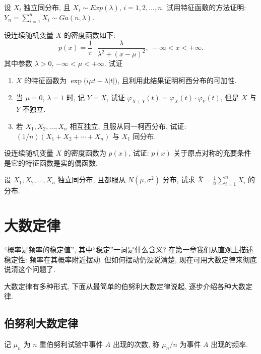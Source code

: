 \begin{xiti}
    \item 设 $ X_i $ 独立同分布, 且 $ X_i \sim Exp ( \lambda ) $, $ i = 1,2,\dotsc,n $. 试用特征函敷的方法证明: $ Y_n = \sum_{i=1}^n X_i \sim Ga ( n, \lambda ) $.
    \item 设连续随机变量 $ X $ 的密度函数如下:
    \begin{equation*}
        p (x) = \frac{1}{\pi} \cdot \frac{\lambda}{\lambda^2 + ( x - \mu )^2}, \ -\infty < x < +\infty.
    \end{equation*}
    其中参数 $ \lambda > 0 $, $ -\infty < \mu < +\infty $. 试证
    \begin{enumerate}
        \item $ X $ 的特征函数为 $ \exp \bigl( i\mu t - \lambda \lvert t \rvert \bigr) $, 且利用此结果证明柯西分布的可加性.
        \item 当 $ \mu = 0 $, $ \lambda = 1 $ 时, 记 $ Y = X $, 试证 $ \varphi_{X + Y} (t) = \varphi_X (t) \cdot \varphi_Y (t) $, 但是 $ X $ 与 $ Y $ 不独立.
        \item 若 $ X_1, X_2, \dotsc, X_n $ 相互独立, 且服从同一柯西分布, 试证: $ (1/n) ( X_1 + X_2 + \dotsb + X_n ) $ 与 $ X_1 $ 同分布.
    \end{enumerate}
    \item 设连续随机变量 $ X $ 的密度函数为 $ p (x) $, 试证: $ p (x) $ 关于原点对称的充要条件是它的特征函数是实的偶函数.
    \item 设 $ X_1, X_2, \dotsc, X_n $ 独立同分布, 且都服从 $ N (\mu, \sigma^2) $ 分布, 试求 $ \bar{X} = \frac{1}{n} \sum_{i=1}^n X_i $ 的分布.
\end{xiti}

\section{大数定律}\label{sec:4.2}

``概率是频率的稳定值'', 其中``稳定''一词是什么含义?
在第一章我们从直观上描述稳定性: 频率在其概率附近摆动.
但如何摆动仍没说清楚, 现在可用大数定律来彻底说清这个问题了.

大数定律有多种形式, 下面从最简单的伯努利大数定律说起, 逐步介绍各种大数定律.

\subsection{伯努利大数定律}

记 $ \mu_n $ 为 $ n $ 重伯努利试验中事件 $ A $ 出现的次数, 称 $ \mu_n / n $ 为事件 $ A $ 出现的频率.

